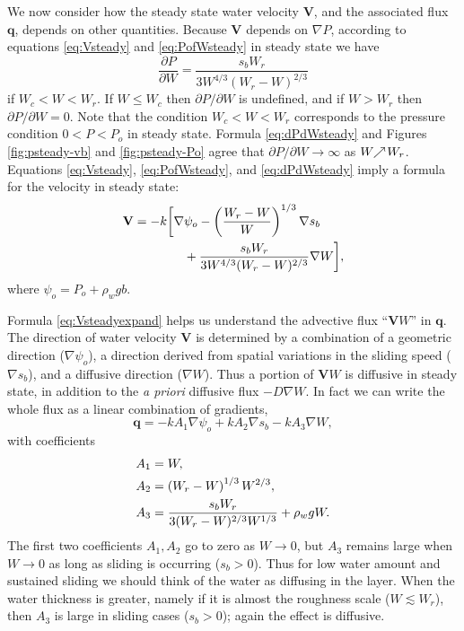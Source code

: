 \documentclass[gmd]{copernicus}   %
\newcommand\bV{\mathbf{V}}
\newcommand\bq{\mathbf{q}}
\newcommand{\grad}{\nabla}
\begin{document}
We now consider how the steady state water velocity $\bV$, and the associated flux $\bq$, depends on other quantities.  Because $\bV$ depends on $\grad P$, according to equations \eqref{eq:Vsteady} and \eqref{eq:PofWsteady} in steady state we have
\begin{equation}
\frac{\partial P}{\partial W} = \frac{s_b W_r}{3 W^{4/3} (W_r - W)^{2/3}} \label{eq:dPdWsteady}
\end{equation}
if $W_c < W < W_r$.  If $W\le W_c$ then $\partial P/\partial W$ is undefined, and if $W>W_r$ then $\partial P/\partial W=0$.  Note that the condition $W_c < W < W_r$ corresponds to the pressure condition $0 < P < P_o$ in steady state.  Formula \eqref{eq:dPdWsteady} and Figures \ref{fig:psteady-vb} and \ref{fig:psteady-Po} agree that $\partial P / \partial W \to \infty$ as $W \!\!\nearrow\! W_r$.  Equations \eqref{eq:Vsteady}, \eqref{eq:PofWsteady}, and \eqref{eq:dPdWsteady} imply a formula for the velocity in steady state:
\begin{align}
\bV &= - k \bigg[\grad \psi_o - \left(\frac{W_r - W}{W}\right)^{1/3} \grad s_b \label{eq:Vsteadyexpand} \\
    & \qquad \qquad + \frac{s_b W_r}{3 W^{4/3} (W_r - W)^{2/3}} \grad W\bigg], \notag
\end{align}
where $\psi_o = P_o + \rho_w g b$.

Formula \eqref{eq:Vsteadyexpand} helps us understand the advective flux ``$\bV W$'' in $\bq$.  The direction of water velocity $\bV$ is determined by a combination of a geometric direction ($\grad \psi_o$), a direction derived from spatial variations in the sliding speed ($\grad s_b$), and a diffusive direction ($\grad W$).  Thus a portion of $\bV W$ is diffusive in steady state, in addition to the \emph{a priori} diffusive flux $- D \grad W$.  In fact we can write the whole flux as a linear combination of gradients,
\begin{equation}
\bq = - k A_1 \grad \psi_o + k A_2 \grad s_b - k A_3 \grad W,  \label{eq:qabstract}
\end{equation}
with coefficients
\begin{align}
&A_1 = W, \label{eq:qcoefficient} \\
&A_2 = \left(W_r - W\right)^{1/3} W^{2/3}, \notag \\
&A_3 = \frac{s_b W_r}{3 (W_r - W)^{2/3} W^{1/3}} + \rho_w g W. \notag
\end{align}
The first two coefficients $A_1,A_2$ go to zero as $W\to 0$, but $A_3$ remains large when $W\to 0$ as long as sliding is occurring ($s_b > 0$).  Thus for low water amount and sustained sliding we should think of the water as diffusing in the layer.  When the water thickness is greater, namely if it is almost the roughness scale ($W\lesssim W_r$), then $A_3$ is large in sliding cases ($s_b>0$); again the effect is diffusive.
\end{document}
